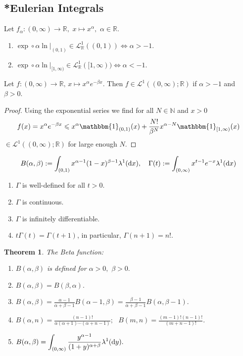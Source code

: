 \documentclass[11pt, a4paper, openany]{book}
\newtheorem{thm}{Theorem}\newtheorem{lem}{Lemma}\newtheorem{crl}{Corollary}
\theoremstyle{definition}
\begin{document}
\subsection{*Eulerian Integrals}
    Let $f_\alpha:(0,\infty)\rightarrow \mathbb{R},\,\,x\mapsto x^\alpha,\,\,\alpha\in\mathbb{R}$.
    \begin{enumerate}
        \item $\exp\circ\alpha\ln|_{(0,1)}\in\mathcal{L}^1_\mathbb{R}((0,1))\Longleftrightarrow \alpha>-1$.
        \item $\exp\circ\alpha\ln|_{[1,\infty)}\in\mathcal{L}^1_\mathbb{R}([1,\infty))\Longleftrightarrow \alpha<-1$.
    \end{enumerate}
    \par Let $f:(0,\infty)\rightarrow\mathbb{R},\,x\mapsto x^{\alpha}e^{-\beta x}$. Then $f\in\mathcal{L}^1((0,\infty);\mathbb{R})$ if $\alpha>-1$ and $\beta>0$.
    \begin{proof}
        Using the exponential series we find for all $N\in\mathbb{N}$ and $x>0$
        \[f(x)=x^{\alpha}e^{-\beta x}\leqslant x^\alpha\mathbbm{1}_{(0,1)}(x)+\frac{N!}{\beta^N}x^{\alpha-N}\mathbbm{1}_{[1,\infty)}(x)\]
        $\in\mathcal{L}^1((0,\infty);\mathbb{R})$ for large enough $N$.
    \end{proof}
    \[B(\alpha,\beta):=\int_{(0,1)}x^{\alpha -1}(1-x)^{\beta -1}\lambda^1(\odif x),\quad\Gamma(t):=\int_{(0,\infty)} x^{t-1}e^{-x}\lambda^1(\odif x)\]
    \begin{enumerate}
        \item $\Gamma$ is well-defined for all $t>0$.
        \item $\Gamma$ is continuous.
        \item $\Gamma$ is infinitely differentiable.
        \item $t\Gamma(t)=\Gamma(t+1)$, in particular, $\Gamma(n+1)=n!$.
    \end{enumerate}
    \begin{thm}
        The Beta function:
        \begin{enumerate}
        \item $B(\alpha,\beta)$ is defined for $\alpha>0,\,\,\beta>0.$
        \item $B(\alpha,\beta)=B(\beta,\alpha).$
        \item $\displaystyle B(\alpha,\beta)=\frac{\alpha -1}{\alpha+\beta -1}B(\alpha -1,\beta)=
        \frac{\beta -1}{\alpha+\beta -1}B(\alpha,\beta -1).$
        \item $\displaystyle B(\alpha, n)=\frac{(n-1)!}{\alpha(\alpha +1)\cdots (\alpha +n-1)};\,\,\,\,
        \displaystyle B(m, n)=\frac{(m-1)!(n-1)!}{(m +n-1)!}.$
        \item $\displaystyle B(\alpha,\beta)=\int_{(0,\infty)}\frac{y^{\alpha -1}}{(1+y)^{\alpha+\beta}}\lambda^1(\odif y).$
    \end{enumerate}
    \end{thm}
\end{document}
